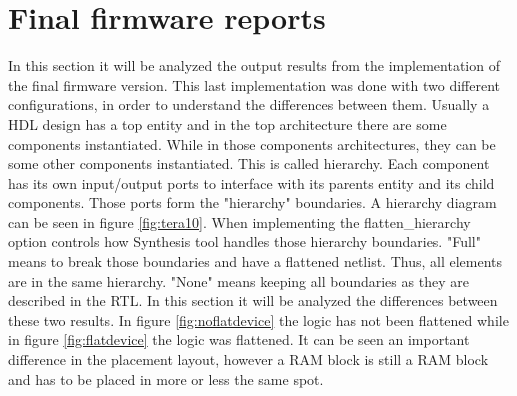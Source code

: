 \section{Final firmware reports}
In this section it will be analyzed the output results from the implementation of the final firmware version. This last implementation was done with two different configurations, in order to understand the differences between them.
Usually a HDL design has a top entity and in the top architecture there are some components instantiated. While in those components architectures, they can be some other components instantiated. This is called hierarchy. Each component has its own input/output ports to interface with its parents entity and its child components. Those ports form the "hierarchy" boundaries. A hierarchy diagram can be seen in figure \ref{fig:tera10}.
When implementing the flatten\_hierarchy option controls how Synthesis tool handles those hierarchy boundaries.
"Full" means to break those boundaries and have a flattened netlist. Thus, all elements are in the same hierarchy. "None" means keeping all boundaries as they are described in the RTL.
In this section it will be analyzed the differences between these two results. In figure \ref{fig:noflatdevice} the logic has not been flattened while in figure \ref{fig:flatdevice} the logic was flattened. It can be seen an important difference in the placement layout, however a RAM block is still a RAM block and has to be placed in more or less the same spot.

